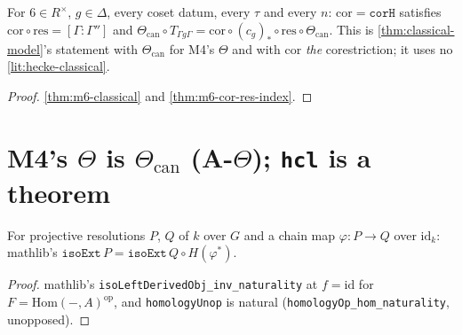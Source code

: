 \begin{theorem}\label{thm:m6-classical-model}
  \leanok
  For $6\in R^\times$, $g\in\Delta$, every coset datum, every $\tau$ and every $n$: $\mathrm{cor}=\texttt{corH}$ satisfies
  $\mathrm{cor}\circ\mathrm{res}=[\Gamma:\Gamma'']$ and $\Theta_{\mathrm{can}}\circ T_{\Gamma g\Gamma}=\mathrm{cor}\circ(c_g)_*\circ\mathrm{res}\circ
  \Theta_{\mathrm{can}}$. This is \ref{thm:classical-model}'s statement with $\Theta_{\mathrm{can}}$ for M4's $\Theta$ and with
  $\mathrm{cor}$ \emph{the} corestriction; it uses no \ref{lit:hecke-classical}.
\end{theorem}
\begin{proof}
  \leanok
  \ref{thm:m6-classical} and \ref{thm:m6-cor-res-index}.
\end{proof}

\section{\texorpdfstring{M4's $\Theta$ is $\Theta_{\mathrm{can}}$ (A-$\Theta$); \texttt{hcl} is a theorem}{M4's Theta is Theta_can (A-Theta); hcl is a theorem}}

\begin{lemma}\label{lem:m6-isoext-lift}
  \leanok
  For projective resolutions $P$, $Q$ of $k$ over $G$ and a chain map $\varphi\colon P\to Q$ over $\mathrm{id}_k$: mathlib's
  $\texttt{isoExt}\,P=\texttt{isoExt}\,Q\circ H(\varphi^*)$.
\end{lemma}
\begin{proof}
  \leanok
  mathlib's \texttt{isoLeftDerivedObj\_inv\_naturality} at $f=\mathrm{id}$ for $F=\mathrm{Hom}(-,A)^{\mathrm{op}}$, and
  \texttt{homologyUnop} is natural (\texttt{homologyOp\_hom\_naturality}, unopposed).
\end{proof}

